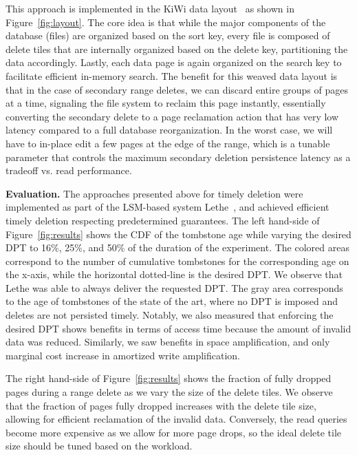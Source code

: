 \documentclass[11pt,dvipdfmx]{article}
\newcommand\Paragraph[1]{\vspace{0.02in}  \noindent \textbf{#1.}}
\begin{document}
This approach is implemented in the KiWi data layout~\cite{Sarkar2020} as shown in
Figure~\ref{fig:layout}. The core idea is that while the major components of the
database (files) are organized based on the sort key, every file is composed of
delete tiles that are internally organized based on the delete key,
partitioning the data accordingly. Lastly, each data page is again organized on
the search key to facilitate efficient in-memory search. The benefit for this
weaved data layout is that in the case of secondary range deletes, we can discard
entire groups of pages at a time, signaling the file system to reclaim this page
instantly, essentially converting the secondary delete to a page reclamation action
that has very low latency compared to a full database reorganization. In the 
worst case, we will have to in-place edit a few pages at the edge of the range, 
which is a tunable parameter that controls the maximum secondary deletion 
persistence latency as a tradeoff vs. read performance. 

\Paragraph{Evaluation} 
The approaches presented above for timely deletion were implemented as part of the
LSM-based system Lethe~\cite{Sarkar2020}, and achieved efficient timely
deletion respecting predetermined guarantees. The left hand-side of Figure~\ref{fig:results} shows the CDF of the 
tombstone age while varying the desired DPT to 16\%, 25\%, and 50\% of the duration
of the experiment. The colored areas correspond to the number of cumulative 
tombstones for the corresponding age on the x-axis, while the horizontal dotted-line
is the desired DPT. We observe that Lethe was able to always deliver the
requested DPT. The gray area corresponds to the age of tombstones of the state of
the art, where no DPT is imposed and deletes are not persisted timely. Notably, we also measured that enforcing the 
desired DPT shows benefits in terms of access time because the amount of invalid 
data was reduced. Similarly, we saw benefits in space amplification, and only marginal
cost increase in amortized write amplification.

The right hand-side of Figure~\ref{fig:results} shows the fraction of fully dropped
pages during a range delete as we vary the size of the delete tiles. We observe
that the fraction of pages fully dropped increases with the delete tile size, allowing
for efficient reclamation of the invalid data. Conversely, the read queries become
more expensive as we allow for more page drops, so the ideal delete tile size should
be tuned based on the workload. 
\end{document}
